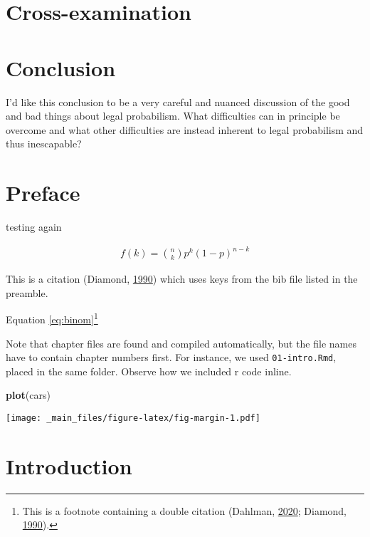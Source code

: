 \documentclass[]{book}
\newenvironment{Shaded}{\begin{snugshade}}{\end{snugshade}}
\newcommand{\KeywordTok}[1]{\textcolor[rgb]{0.13,0.29,0.53}{\textbf{#1}}}
\newcommand{\NormalTok}[1]{#1}
\begin{document}
\chapter{Cross-examination}

\chapter{Conclusion}

I'd like this conclusion
to be a very
careful and nuanced discussion of the
good and bad things about
legal probabilism. What difficulties can
in principle be overcome and what other difficulties are instead
inherent to legal probabilism and thus inescapable?

\hypertarget{preface}{%
\chapter*{Preface}\label{preface}}

testing again

\begin{align} 
  f\left(k\right) = \binom{n}{k} p^k\left(1-p\right)^{n-k}
  \label{eq:binom}
\end{align}

This is a citation (Diamond, \protect\hyperlink{ref-diamond90}{1990}) which uses keys from the bib file listed in the preamble.

Equation \eqref{eq:binom}\footnote{This is a footnote containing a double citation (Dahlman, \protect\hyperlink{ref-dahlmanNakedStat2020}{2020}; Diamond, \protect\hyperlink{ref-diamond90}{1990}).}

Note that chapter files are found and compiled automatically, but the file names have to contain chapter numbers first. For instance, we used \texttt{01-intro.Rmd}, placed in the same folder. Observe how we included r code inline.

\begin{Shaded}
\begin{Highlighting}[]
\KeywordTok{plot}\NormalTok{(cars)}
\end{Highlighting}
\end{Shaded}

\texttt{[image: \_main\_files/figure-latex/fig-margin-1.pdf]}

\hypertarget{ch:intro}{%
\chapter{Introduction}\label{ch:intro}}
\end{document}

